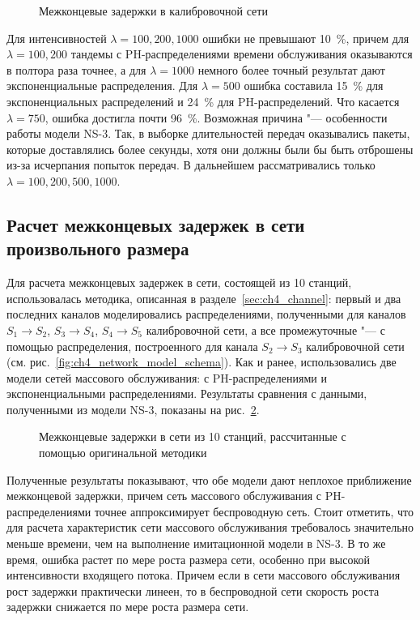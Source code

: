 \begin{figure}[h]
  \caption{Межконцевые задержки в калибровочной сети}
  \label{fig:ch4_ns3_calibration_delays}
\end{figure}

Для интенсивностей $\lambda = 100, 200, 1000$ ошибки не превышают 10~\%, причем для $\lambda = 100, 200$ тандемы с PH-распределениями времени обслуживания оказываются в полтора раза точнее, а для $\lambda = 1000$ немного более точный результат дают экспоненциальные распределения. Для $\lambda = 500$ ошибка составила 15~\% для экспоненциальных распределений и 24~\% для PH-распределений. Что касается $\lambda = 750$, ошибка достигла почти 96~\%. Возможная причина "--- особенности работы модели NS-3. Так, в выборке длительностей передач оказывались пакеты, которые доставлялись более секунды, хотя они должны были бы быть отброшены из-за исчерпания попыток передач. В дальнейшем рассматривались только $\lambda = 100, 200, 500, 1000$.


\subsection{Расчет межконцевых задержек в сети произвольного размера}

Для расчета межконцевых задержек в сети, состоящей из 10 станций, использовалась методика, описанная в разделе~\ref{sec:ch4_channel}: первый и два последних каналов моделировались распределениями, полученными для каналов $S_1 \rightarrow S_2$, $S_3 \rightarrow S_4$, $S_4 \rightarrow S_5$ калибровочной сети, а все промежуточные "--- с помощью распределения, построенного для канала $S_2 \rightarrow S_3$ калибровочной сети (см. рис.~\ref{fig:ch4_network_model_schema}). Как и ранее, использовались две модели сетей массового обслуживания: с PH-распределениями и экспоненциальными распределениями. Результаты сравнения с данными, полученными из модели NS-3, показаны на рис.~\ref{fig:ch4_ns3_tandem_delays}.

\begin{figure}[h]
  \caption{Межконцевые задержки в сети из 10 станций, рассчитанные с помощью оригинальной методики}
  \label{fig:ch4_ns3_tandem_delays}
\end{figure}

Полученные результаты показывают, что обе модели дают неплохое приближение межконцевой задержки, причем сеть массового обслуживания с PH-распределениями точнее аппроксимирует беспроводную сеть. Стоит отметить, что для расчета характеристик сети массового обслуживания требовалось значительно меньше времени, чем на выполнение имитационной модели в NS-3. В то же время, ошибка растет по мере роста размера сети, особенно при высокой интенсивности входящего потока. Причем если в сети массового обслуживания рост задержки практически линеен, то в беспроводной сети скорость роста задержки снижается по мере роста размера сети.


